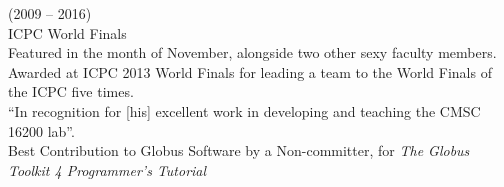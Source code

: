 \documentclass{resume}
\begin{document}
\begin{category}{}
 (2009 -- 2016)\\
ICPC World Finals
\\Featured in the month of November, alongside two other sexy faculty members.
\\Awarded at ICPC 2013 World Finals for leading a team to the World Finals of the ICPC five times.
\\``In recognition for [his] excellent work in developing and teaching the CMSC 16200 lab''.
\\Best Contribution to Globus Software by a Non-committer, for \emph{The Globus Toolkit 4 Programmer's Tutorial}
\end{category}
\end{document}
